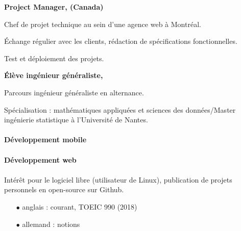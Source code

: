 \documentclass{cv}
\begin{document}
\begin{expbox}[title={mai 2018, \faicon{clock-o} 4 mois}]

	\begin{minipage}[c]{20mm}
	\end{minipage}
	\begin{minipage}[c]{0.8\textwidth}

	\textbf{Project Manager, \adfab{} (Canada)} 

	Chef de projet technique au sein d'une agence web à Montréal.

	Échange régulier avec les clients, rédaction de spécifications fonctionnelles.

	Test et déploiement des projets.
	\end{minipage}

\end{expbox}

\begin{expbox}[title={2016 -- 2019}]

	\begin{minipage}[c]{20mm}
	\end{minipage}
	\begin{minipage}[c]{0.8\textwidth}

	\textbf{Élève ingénieur généraliste, \ecn{}} 

	Parcours ingénieur généraliste en alternance.

	Spécialisation : mathématiques appliquées et sciences des données/Master ingénierie statistique à l'Université de Nantes.
	\end{minipage}

\end{expbox}



\paragraph{Développement mobile} 

  

\paragraph{Développement web}
      

\paragraph{} Intérêt pour le logiciel libre (utilisateur de Linux), publication de projets personnels en open-source sur Github.



\begin{itemize}
\setlength\itemsep{0pt}
\item[$\bullet$] anglais : courant, TOEIC 990 (2018)
\item[$\bullet$] allemand : notions
\end{itemize}



\end{document}
